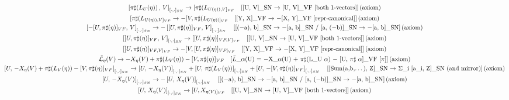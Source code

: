 \documentclass[11pt]{article}
\begin{document}
{\begin{gather*}
\left[\pi\sharp\!\left(L_U\!\left(\eta\right)\right),\, V\right]_{[\cdot,\cdot]_{SN}} \to [\pi\sharp(L_{U(\eta)),V]_{VF}} \quad \text{[[U, V]\_SN \ensuremath{\to} [U, V]\_VF  [both 1-vectors]]\,(axiom)} \\
[\pi\sharp(L_{U(\eta)),V]_{VF}} \to -[V,\pi\sharp(L_{U(\eta))]_{VF}} \quad \text{[[Y, X]\_VF \ensuremath{\to} \ensuremath{-}[X, Y]\_VF  [repr-canonical]]\,(axiom)} \\
\left[-[U,\pi\sharp(\eta)]_{VF},\, V\right]_{[\cdot,\cdot]_{SN}} \to -\left[[U,\pi\sharp(\eta)]_{VF},\, V\right]_{[\cdot,\cdot]_{SN}} \quad \text{[[(\ensuremath{-}a), b]\_SN \ensuremath{\to} \ensuremath{-}[a, b]\_SN  /  [a, (\ensuremath{-}b)]\_SN \ensuremath{\to} \ensuremath{-}[a, b]\_SN]\,(axiom)} \\
\left[[U,\pi\sharp(\eta)]_{VF},\, V\right]_{[\cdot,\cdot]_{SN}} \to [[U,\pi\sharp(\eta)]_{VF,V]_{VF}} \quad \text{[[U, V]\_SN \ensuremath{\to} [U, V]\_VF  [both 1-vectors]]\,(axiom)} \\
[[U,\pi\sharp(\eta)]_{VF,V]_{VF}} \to -[V,[U,\pi\sharp(\eta)]_{VF]_{VF}} \quad \text{[[Y, X]\_VF \ensuremath{\to} \ensuremath{-}[X, Y]\_VF  [repr-canonical]]\,(axiom)} \\
\tilde{\mathcal{L}}_{\eta}\!\left(V\right) \to -X_\eta(V) + \pi\sharp\!\left(L_V\!\left(\eta\right)\right) - [V,\pi\sharp(\eta)]_{VF} \quad \text{[\ensuremath{\tilde{L}}\_\ensuremath{\alpha}(U) = \ensuremath{-}X\_{\ensuremath{\alpha}(U)} + \ensuremath{\pi}\ensuremath{\sharp}(L\_U \ensuremath{\alpha}) \ensuremath{-} [U, \ensuremath{\pi}\ensuremath{\sharp} \ensuremath{\alpha}]\_VF [\ensuremath{\pi}]]\,(axiom)} \\
\left[U,\, -X_\eta(V) + \pi\sharp\!\left(L_V\!\left(\eta\right)\right) - [V,\pi\sharp(\eta)]_{VF}\right]_{[\cdot,\cdot]_{SN}} \to \left[U,\, -X_\eta(V)\right]_{[\cdot,\cdot]_{SN}} + \left[U,\, \pi\sharp\!\left(L_V\!\left(\eta\right)\right)\right]_{[\cdot,\cdot]_{SN}} + \left[U,\, -[V,\pi\sharp(\eta)]_{VF}\right]_{[\cdot,\cdot]_{SN}} \quad \text{[[Sum(a,b,\ensuremath{\dots}), Z]\_SN \ensuremath{\to} \ensuremath{\Sigma}\_i [a\_i, Z]\_SN  (and mirror)]\,(axiom)} \\
\left[U,\, -X_\eta(V)\right]_{[\cdot,\cdot]_{SN}} \to -\left[U,\, X_\eta(V)\right]_{[\cdot,\cdot]_{SN}} \quad \text{[[(\ensuremath{-}a), b]\_SN \ensuremath{\to} \ensuremath{-}[a, b]\_SN  /  [a, (\ensuremath{-}b)]\_SN \ensuremath{\to} \ensuremath{-}[a, b]\_SN]\,(axiom)} \\
\left[U,\, X_\eta(V)\right]_{[\cdot,\cdot]_{SN}} \to [U,X_{\eta(V)]_{VF}} \quad \text{[[U, V]\_SN \ensuremath{\to} [U, V]\_VF  [both 1-vectors]]\,(axiom)} \\

\end{gather*}}
\end{document}
